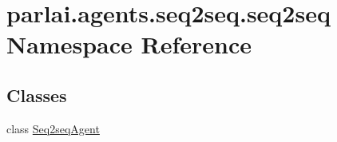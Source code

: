 \hypertarget{namespaceparlai_1_1agents_1_1seq2seq_1_1seq2seq}{}\section{parlai.\+agents.\+seq2seq.\+seq2seq Namespace Reference}
\label{namespaceparlai_1_1agents_1_1seq2seq_1_1seq2seq}
\subsection*{Classes}
\begin{DoxyCompactItemize}
\item 
class \hyperlink{classparlai_1_1agents_1_1seq2seq_1_1seq2seq_1_1Seq2seqAgent}{Seq2seq\+Agent}
\end{DoxyCompactItemize}
